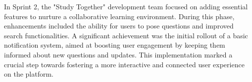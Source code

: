 



In Sprint 2, the "Study Together" development team focused on adding essential features to nurture a collaborative learning environment. During this phase, enhancements included the ability for users to pose questions and improved search functionalities. A significant achievement was the initial rollout of a basic notification system, aimed at boosting user engagement by keeping them informed about new questions and updates. This implementation marked a crucial step towards fostering a more interactive and connected user experience on the platform.

